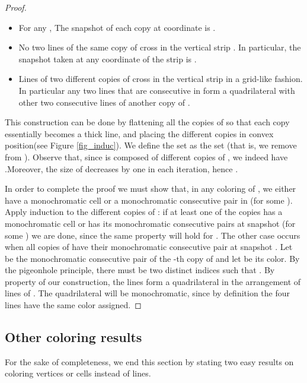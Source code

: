 \documentclass[11pt,a4paper]{article}
\newcommand{\sholong}[2]{#2}
\begin{document}
\begin{proof}
\begin{itemize}
\item  For any , The snapshot of each copy  at coordinate  is .
\item  No two lines of the same copy  of  cross in the vertical strip . In particular,  the snapshot taken at any coordinate of the strip is .
\item  Lines of two different copies of  cross in the  vertical strip  in a grid-like fashion. In particular any two lines that are consecutive in  form a quadrilateral with other two consecutive lines of another copy of .
\end{itemize}
This construction can be done by flattening all the copies of  so that each copy essentially becomes a thick line, and placing the different copies in convex position\sholong{.}{(see Figure \ref{fig_induc}). We define the set  as the set  (that is, we remove  from ).}
 Observe that, since  is composed of  different copies of , we indeed have .\sholong{}{Moreover, the size of  decreases by one in each iteration, hence .}

In order to complete the proof we must show that, in any coloring  of , we either have a monochromatic cell or a  monochromatic consecutive pair in  (for some ). Apply induction to the different copies of : if at least one of the copies has a monochromatic cell or has its monochromatic consecutive pairs at snapshot  (for some ) we are done, since the same property will hold for . The other case occurs when all copies of  have their monochromatic consecutive pair at snapshot . Let  be the monochromatic consecutive pair of the -th copy of  and let  be its color. By the pigeonhole principle, there must be two distinct indices  such that . By property  of our construction, the lines  form a quadrilateral in the arrangement of lines of . The quadrilateral will be monochromatic, since by definition the four lines have the same color assigned.
\end{proof}

\subsection{Other coloring results}
For the sake of completeness, we end this section by stating two easy results on coloring vertices or cells instead of lines.
\end{document}

